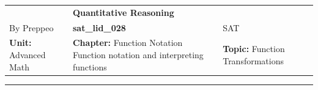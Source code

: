 \documentclass[11pt,paper=a4,answers]{exam}
\begin{document}
\begin{center}
    \centering
    \renewcommand{\arraystretch}{1.5}
    \begin{tabularx}{\textwidth}{YYY}
    & \normalsize\bf{{\Large{{Quantitative Reasoning}}}} & \\
    By Preppeo & \normalsize\bf{{sat\_lid\_028}} & SAT\\
    \normalsize{{\textbf{{Unit:}} Advanced Math}} & \normalsize{{\textbf{{Chapter:}} Function Notation	Function notation and interpreting functions}} & \normalsize{{\textbf{{Topic:}} Function Transformations}} \\
    \end{tabularx}
\end{center}
\par\noindent\rule{\textwidth}{1pt}
\end{document}
